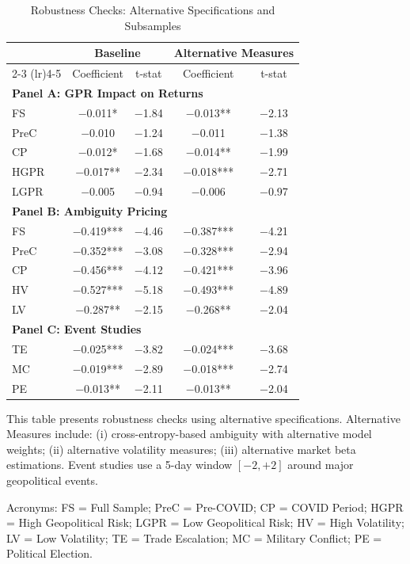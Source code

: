 \documentclass[preprint,12pt,authoryear]{elsarticle}
\begin{document}
\begin{table}[htbp]
\centering
\caption{Robustness Checks: Alternative Specifications and Subsamples}
\label{tab:robustness}
\begin{threeparttable}
\begin{tabular*}{\textwidth}{@{\extracolsep{\fill}} lcccc @{\extracolsep{\fill}}}
\toprule
& \multicolumn{2}{c}{Baseline} & \multicolumn{2}{c}{Alternative Measures} \\
\cmidrule(lr){2-3} \cmidrule(lr){4-5} 
& Coefficient & t-stat & Coefficient & t-stat \\
\midrule
\midrule
\multicolumn{5}{l}{\textbf{Panel A: GPR Impact on Returns}} \\
FS & $-$0.011* & $-$1.84 & $-$0.013** & $-$2.13 \\
PreC & $-$0.010 & $-$1.24 & $-$0.011 & $-$1.38 \\
CP & $-$0.012* & $-$1.68 & $-$0.014** & $-$1.99 \\
HGPR & $-$0.017** & $-$2.34 & $-$0.018*** & $-$2.71 \\
LGPR & $-$0.005 & $-$0.94 & $-$0.006 & $-$0.97 \\
\midrule
\multicolumn{5}{l}{\textbf{Panel B: Ambiguity Pricing}} \\
FS & $-$0.419*** & $-$4.46 & $-$0.387*** & $-$4.21 \\
PreC & $-$0.352*** & $-$3.08 & $-$0.328*** & $-$2.94 \\
CP & $-$0.456*** & $-$4.12 & $-$0.421*** & $-$3.96 \\
HV & $-$0.527*** & $-$5.18 & $-$0.493*** & $-$4.89 \\
LV & $-$0.287** & $-$2.15 & $-$0.268** & $-$2.04 \\
\midrule
\multicolumn{5}{l}{\textbf{Panel C: Event Studies}} \\
TE & $-$0.025*** & $-$3.82 & $-$0.024*** & $-$3.68 \\
MC & $-$0.019*** & $-$2.89 & $-$0.018*** & $-$2.74 \\
PE & $-$0.013** & $-$2.11 & $-$0.013** & $-$2.04 \\
\bottomrule
\end{tabular*}
\begin{tablenotes}[flushleft]
\small
\item[] This table presents robustness checks using alternative specifications. Alternative Measures include: (i) cross-entropy-based ambiguity with alternative model weights; (ii) alternative volatility measures; (iii) alternative market beta estimations. Event studies use a 5-day window $[-2, +2]$ around major geopolitical events.
\item[] Acronyms: FS = Full Sample; PreC = Pre-COVID; CP = COVID Period; HGPR = High Geopolitical Risk; LGPR = Low Geopolitical Risk; HV = High Volatility; LV = Low Volatility; TE = Trade Escalation; MC = Military Conflict; PE = Political Election.
\end{tablenotes}
\end{threeparttable}
\end{table}
\end{document}
